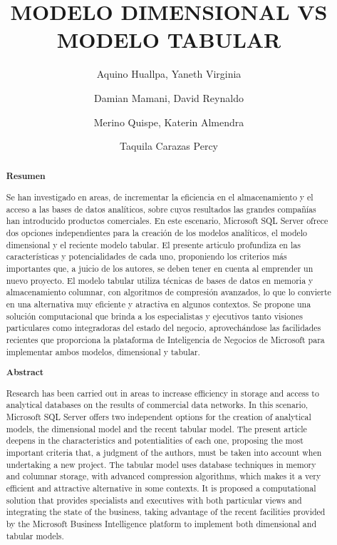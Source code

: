 \documentclass[%
 reprint,
 amsmath,amssymb,
 aps,
]{revtex4-1}
\begin{document}
\title{ MODELO DIMENSIONAL VS MODELO TABULAR}
\author{Aquino Huallpa, Yaneth Virginia           }
\author{Damian Mamani, David Reynaldo 	  }
\author{Merino Quispe, Katerin Almendra 	  }
\author{Taquila Carazas Percy	  }
		
%

\begin{abstract}
\begin{center}
\textbf{Resumen}
\end{center}

Se han investigado  en  areas,  de  incrementar  la  eficiencia  en  el almacenamiento y el acceso a las bases de datos analíticos, sobre cuyos resultados las grandes compañías han  introducido  productos  comerciales.  En  este  escenario,  Microsoft  SQL  Server ofrece  dos opciones  independientes para  la creación  de los  modelos analíticos,  el  modelo dimensional  y  el reciente modelo  tabular. El  presente articulo profundiza en las características y potencialidades de cada uno, proponiendo los criterios más importantes que, a juicio de los autores, se deben tener en cuenta al emprender  un  nuevo  proyecto.  
El  modelo  tabular  utiliza  técnicas  de  bases  de  datos  en  memoria  y almacenamiento  columnar,  con  algoritmos  de  compresión  avanzados,  lo  que  lo  convierte  en  una alternativa muy eficiente y atractiva en algunos contextos.  Se propone una solución computacional que brinda  a  los  especialistas  y  ejecutivos  tanto  visiones  particulares  como  integradoras  del  estado  del negocio,  aprovechándose  las  facilidades  recientes  que  proporciona  la  plataforma  de  Inteligencia  de Negocios  de  Microsoft  para  implementar  ambos  modelos, dimensional  y  tabular.
\begin{center}
\textbf{Abstract}
\end{center}
Research has been carried out in areas to increase efficiency in storage and access to analytical databases on the results of commercial data networks. In this scenario, Microsoft SQL Server offers two independent options for the creation of analytical models, the dimensional model and the recent tabular model. The present article deepens in the characteristics and potentialities of each one, proposing the most important criteria that, a judgment of the authors, must be taken into account when undertaking a new project.
The tabular model uses database techniques in memory and columnar storage, with advanced compression algorithms, which makes it a very efficient and attractive alternative in some contexts. It is proposed a computational solution that provides specialists and executives with both particular views and integrating the state of the business, taking advantage of the recent facilities provided by the Microsoft Business Intelligence platform to implement both dimensional and tabular models.
\end{abstract}
\maketitle
\end{document}
